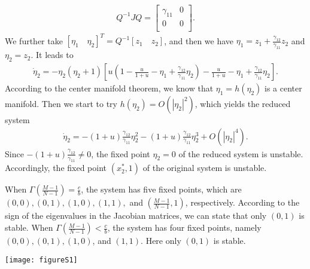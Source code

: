 \documentclass[9pt]{elife}
\begin{document}
\begin{appendixbox}
\begin{eqnarray*}
Q^{-1}JQ =
  \left[ {\begin{array}{cc}
    \gamma_{11} & 0 \\
    0 & 0 \\
  \end{array} } \right].
\end{eqnarray*}
We further take $[\eta_{1} \quad \eta_{2}]^{T}=Q^{-1}[z_{1} \quad z_{2}]$, and then we have $\eta_{1}=z_{1}+\frac{\gamma_{12}}{\gamma_{11}}z_{2}$ and $\eta_{2}=z_{2}$. It leads to
\begin{eqnarray*}
\dot{\eta}_{2}=-\eta_{2}(\eta_{2}+1)[u(1-\frac{u}{1+u}-\eta_{1}+\frac{\gamma_{12}}{\gamma_{11}}\eta_{2})-\frac{u}{1+u}-\eta_{1}+\frac{\gamma_{12}}{\gamma_{11}}\eta_{2}].
\end{eqnarray*}
According to the center manifold theorem, we know that $\eta_{1}=h(\eta_{2})$ is a center manifold. Then we start to try $h(\eta_{2}) = O(|\eta_{2}|^{2})$, which yields the reduced system
\begin{eqnarray*}
\dot{\eta}_{2}=-(1+u)\frac{\gamma_{12}}{\gamma_{11}}\eta_{2}^{2}-(1+u)\frac{\gamma_{12}}{\gamma_{11}}\eta_{2}^{3}+O(|\eta_{2}|^{4}).
\end{eqnarray*}
Since $-(1+u)\frac{\gamma_{12}}{\gamma_{11}}\neq 0$, the fixed point $\eta_{2}=0$ of the reduced system is unstable. Accordingly, the fixed point $(x_{2}^{*}, 1)$ of the original system is unstable.

When $\Gamma(\frac{M-1}{N-1})=\frac{c}{b}$, the system has five fixed points, which are $(0, 0), (0, 1), (1, 0), (1, 1),$ and $(\frac{M-1}{N-1}, 1)$, respectively. According to the sign of the eigenvalues in the Jacobian matrices, we can state that only $(0, 1)$ is stable. When $\Gamma(\frac{M-1}{N-1})<\frac{c}{b}$, the system has four fixed points, namely $(0, 0), (0, 1), (1, 0)$, and $(1, 1)$. Here only $(0, 1)$ is stable.

\begin{center}
\texttt{[image: figureS1]}
\end{center}

\end{appendixbox}
\end{document}
